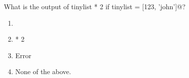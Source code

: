 \question
What is the output of \lstinline@print tinylist * 2 if tinylist = [123, 'john']@?

\begin{enumerate}
\item {}\lstinline@
\item \lstinline@[123, 'john'] * 2\lstinline@
\item Error
\item None of the above.
\end{enumerate}

